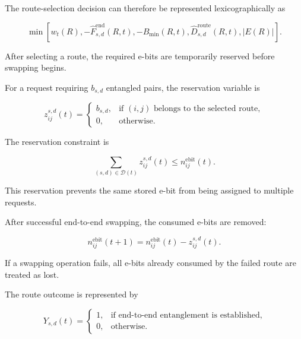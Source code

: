 The route-selection decision can therefore be represented lexicographically as

\begin{equation}
    \min
    \left[
    w_t(R),
    -
    \widehat{F}_{s,d}^{\mathrm{end}}(R,t),
    -
    B_{\min}(R,t),
    \widehat{D}_{s,d}^{\mathrm{route}}(R,t),
    |E(R)|
    \right].
\end{equation}

After selecting a route, the required e-bits are temporarily reserved before swapping begins.

For a request requiring $b_{s,d}$ entangled pairs, the reservation variable is

\begin{equation}
    z_{ij}^{s,d}(t)
    =
    \begin{cases}
        b_{s,d},
        & \text{if $(i,j)$ belongs to the selected route},\\
        0,
        & \text{otherwise}.
    \end{cases}
\end{equation}

The reservation constraint is

\begin{equation}
    \sum_{
    (s,d)
    \in
    \mathcal{D}(t)
    }
    z_{ij}^{s,d}(t)
    \leq
    n_{ij}^{\mathrm{ebit}}(t).
\end{equation}

This reservation prevents the same stored e-bit from being assigned to multiple requests.

After successful end-to-end swapping, the consumed e-bits are removed:

\begin{equation}
    n_{ij}^{\mathrm{ebit}}(t+1)
    =
    n_{ij}^{\mathrm{ebit}}(t)
    -
    z_{ij}^{s,d}(t).
\end{equation}

If a swapping operation fails, all e-bits already consumed by the failed route are treated as lost.

The route outcome is represented by

\begin{equation}
    Y_{s,d}(t)
    =
    \begin{cases}
        1, & \text{if end-to-end entanglement is established},\\
        0, & \text{otherwise}.
    \end{cases}
\end{equation}

